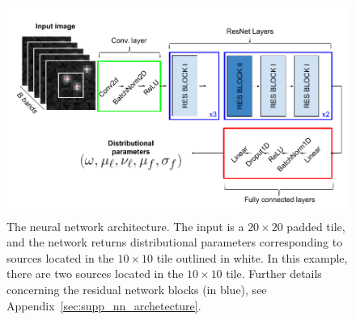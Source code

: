 
\begin{figure}[!tb]
    \centering
    \includegraphics[width=\textwidth]{figures/vi_figures/starnet_archetecture8.png}
    \vspace{-1.cm}
    \caption{The neural network architecture. The input is a $20\times 20$ padded tile, and the network returns distributional parameters corresponding to sources located in the $10\times 10$ tile outlined in white.
    In this example, there are two sources located in the $10\times10$ tile.
    Further details concerning the residual network blocks (in blue), see 
    Appendix~\ref{sec:supp_nn_archetecture}.
    }
    \label{fig:starnet_arch}
\end{figure}




